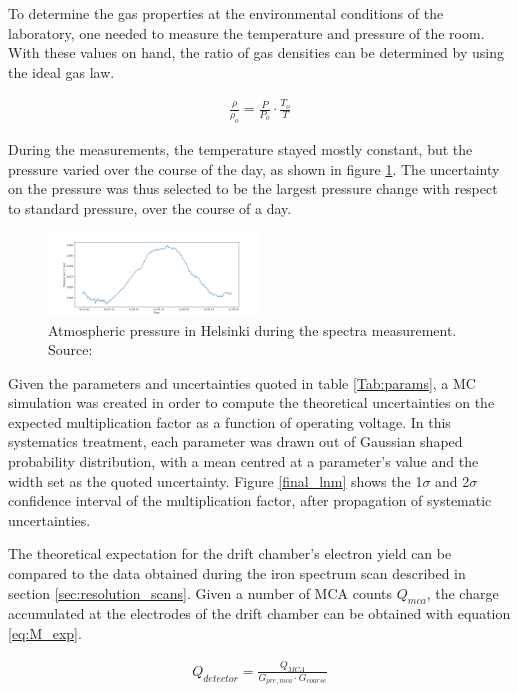 To determine the gas properties at the environmental conditions of the laboratory, one needed to measure the temperature and pressure of the room. With these values on hand, the ratio of gas densities can be determined by using the ideal gas law.

\begin{align}
  \label{eq:gaslaw}
  \frac{\rho}{\rho_{o}} = \frac{P}{P_{o}}\cdot \frac{T_{o}}{T}
\end{align}

During the measurements, the temperature stayed mostly constant, but the pressure varied over the course of the day, as shown in figure \ref{fig:pressure}. The uncertainty on the pressure was thus selected to be the largest pressure change with respect to standard pressure, over the course of a day.

\begin{figure}[htb!]
  \includegraphics[width=0.5\textwidth]{graphics/pressure_monitoring.png}
  \caption{Atmospheric pressure in Helsinki during the spectra measurement. Source: \cite{meteo}}
  \label{fig:pressure}
\end{figure}

Given the parameters and uncertainties quoted in table \ref{Tab:params}, a MC simulation was created in order to compute the theoretical uncertainties on the expected multiplication factor as a function of operating voltage. In this systematics treatment, each parameter was drawn out of Gaussian shaped probability distribution, with a mean centred at a parameter's value and the width set as the quoted uncertainty. Figure \ref{final_lnm} shows the 1$\sigma$ and 2$\sigma$ confidence interval of the multiplication factor, after propagation of systematic uncertainties.

The theoretical expectation for the drift chamber's electron yield can be compared to the data obtained during the iron spectrum scan described in section \ref{sec:resolution_scans}. Given a number of MCA counts $Q_{mca}$, the charge accumulated at the electrodes of the drift chamber can be obtained with equation \ref{eq:M_exp}.

\begin{align}
  \label{eq:M_exp}
  Q_{detector} = \frac{Q_{MCA}}{G_{pre,mca}\cdot{G_{coarse}}}
\end{align}

